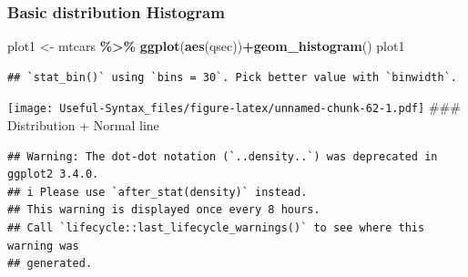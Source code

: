 \documentclass[
]{article}
\newenvironment{Shaded}{\begin{snugshade}}{\end{snugshade}}
\newcommand{\AttributeTok}[1]{\textcolor[rgb]{0.13,0.29,0.53}{#1}}
\newcommand{\CommentTok}[1]{\textcolor[rgb]{0.56,0.35,0.01}{\textit{#1}}}
\newcommand{\DecValTok}[1]{\textcolor[rgb]{0.00,0.00,0.81}{#1}}
\newcommand{\FunctionTok}[1]{\textcolor[rgb]{0.13,0.29,0.53}{\textbf{#1}}}
\newcommand{\NormalTok}[1]{#1}
\newcommand{\OtherTok}[1]{\textcolor[rgb]{0.56,0.35,0.01}{#1}}
\newcommand{\SpecialCharTok}[1]{\textcolor[rgb]{0.81,0.36,0.00}{\textbf{#1}}}
\begin{document}
\hypertarget{basic-distribution-histogram}{%
\subsubsection{Basic distribution Histogram}\label{basic-distribution-histogram}}

\begin{Shaded}
\begin{Highlighting}[]
\NormalTok{plot1 }\OtherTok{\textless{}{-}}\NormalTok{ mtcars }\SpecialCharTok{\%\textgreater{}\%} \FunctionTok{ggplot}\NormalTok{(}\FunctionTok{aes}\NormalTok{(qsec))}\SpecialCharTok{+}\FunctionTok{geom\_histogram}\NormalTok{()}
\NormalTok{plot1}
\end{Highlighting}
\end{Shaded}

\begin{verbatim}
## `stat_bin()` using `bins = 30`. Pick better value with `binwidth`.
\end{verbatim}

\texttt{[image: Useful-Syntax\_files/figure-latex/unnamed-chunk-62-1.pdf]}
\#\#\# Distribution + Normal line

\begin{Shaded}
\end{Shaded}

\begin{verbatim}
## Warning: The dot-dot notation (`..density..`) was deprecated in ggplot2 3.4.0.
## i Please use `after_stat(density)` instead.
## This warning is displayed once every 8 hours.
## Call `lifecycle::last_lifecycle_warnings()` to see where this warning was
## generated.
\end{verbatim}
\end{document}
